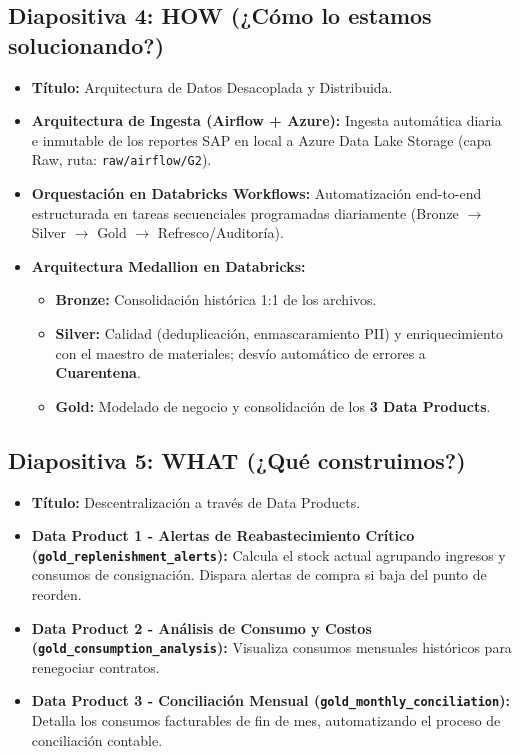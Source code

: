 \documentclass[11pt,a4paper]{article}
\begin{document}
\subsection{Diapositiva 4: HOW (¿Cómo lo estamos solucionando?)}
\begin{itemize}[label=$\bullet$]
    \item \textbf{Título:} Arquitectura de Datos Desacoplada y Distribuida.
    \item \textbf{Arquitectura de Ingesta (Airflow + Azure):} Ingesta automática diaria e inmutable de los reportes SAP en local a Azure Data Lake Storage (capa Raw, ruta: \texttt{raw/airflow/G2}).
    \item \textbf{Orquestación en Databricks Workflows:} Automatización end-to-end estructurada en tareas secuenciales programadas diariamente (Bronze $\rightarrow$ Silver $\rightarrow$ Gold $\rightarrow$ Refresco/Auditoría).
    \item \textbf{Arquitectura Medallion en Databricks:}
    \begin{itemize}[label=--]
        \item \textbf{Bronze:} Consolidación histórica 1:1 de los archivos.
        \item \textbf{Silver:} Calidad (deduplicación, enmascaramiento PII) y enriquecimiento con el maestro de materiales; desvío automático de errores a \textbf{Cuarentena}.
        \item \textbf{Gold:} Modelado de negocio y consolidación de los \textbf{3 Data Products}.
    \end{itemize}
\end{itemize}

\subsection{Diapositiva 5: WHAT (¿Qué construimos?)}
\begin{itemize}[label=$\bullet$]
    \item \textbf{Título:} Descentralización a través de Data Products.
    \item \textbf{Data Product 1 - Alertas de Reabastecimiento Crítico (\texttt{gold\_replenishment\_alerts}):} Calcula el stock actual agrupando ingresos y consumos de consignación. Dispara alertas de compra si baja del punto de reorden.
    \item \textbf{Data Product 2 - Análisis de Consumo y Costos (\texttt{gold\_consumption\_analysis}):} Visualiza consumos mensuales históricos para renegociar contratos.
    \item \textbf{Data Product 3 - Conciliación Mensual (\texttt{gold\_monthly\_conciliation}):} Detalla los consumos facturables de fin de mes, automatizando el proceso de conciliación contable.
\end{itemize}
\end{document}
